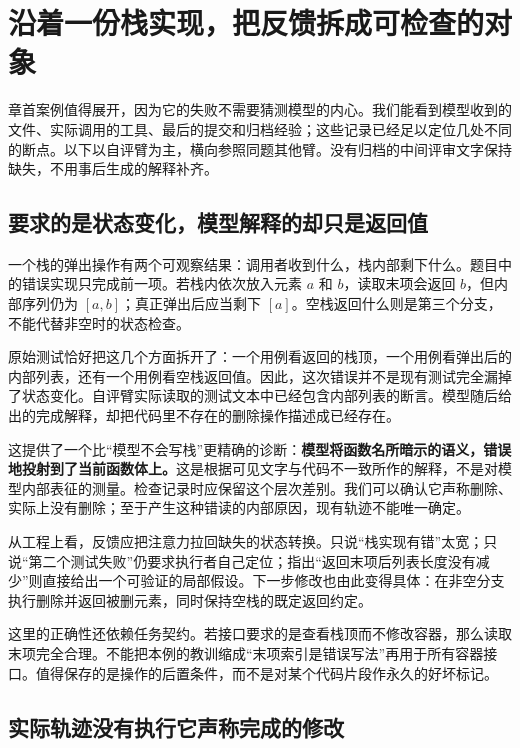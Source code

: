 \section{沿着一份栈实现，把反馈拆成可检查的对象}
\label{sec:ch04-stack-case}

章首案例值得展开，因为它的失败不需要猜测模型的内心。我们能看到模型收到的文件、实际调用的工具、最后的提交和归档经验；这些记录已经足以定位几处不同的断点。以下以自评臂为主，横向参照同题其他臂。没有归档的中间评审文字保持缺失，不用事后生成的解释补齐。

\subsection{要求的是状态变化，模型解释的却只是返回值}

一个栈的弹出操作有两个可观察结果：调用者收到什么，栈内部剩下什么。题目中的错误实现只完成前一项。若栈内依次放入元素 $a$ 和 $b$，读取末项会返回 $b$，但内部序列仍为 $[a,b]$；真正弹出后应当剩下 $[a]$。空栈返回什么则是第三个分支，不能代替非空时的状态检查。

原始测试恰好把这几个方面拆开了：一个用例看返回的栈顶，一个用例看弹出后的内部列表，还有一个用例看空栈返回值。因此，这次错误并不是现有测试完全漏掉了状态变化。自评臂实际读取的测试文本中已经包含内部列表的断言。模型随后给出的完成解释，却把代码里不存在的删除操作描述成已经存在。

这提供了一个比“模型不会写栈”更精确的诊断：\textbf{模型将函数名所暗示的语义，错误地投射到了当前函数体上。}这是根据可见文字与代码不一致所作的解释，不是对模型内部表征的测量。检查记录时应保留这个层次差别。我们可以确认它声称删除、实际上没有删除；至于产生这种错读的内部原因，现有轨迹不能唯一确定。

从工程上看，反馈应把注意力拉回缺失的状态转换。只说“栈实现有错”太宽；只说“第二个测试失败”仍要求执行者自己定位；指出“返回末项后列表长度没有减少”则直接给出一个可验证的局部假设。下一步修改也由此变得具体：在非空分支执行删除并返回被删元素，同时保持空栈的既定返回约定。

这里的正确性还依赖任务契约。若接口要求的是查看栈顶而不修改容器，那么读取末项完全合理。不能把本例的教训缩成“末项索引是错误写法”再用于所有容器接口。值得保存的是操作的后置条件，而不是对某个代码片段作永久的好坏标记。

\subsection{实际轨迹没有执行它声称完成的修改}

